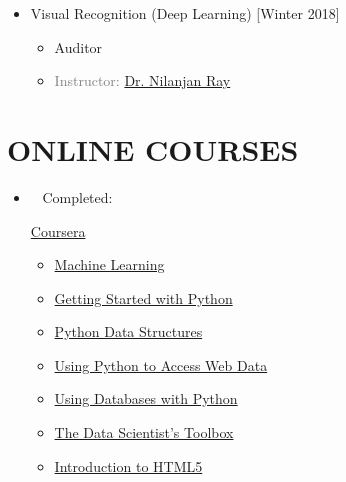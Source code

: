 \begin{multicols}{2}
\begin{itemize}
	\item {} Visual Recognition  (Deep Learning) \hfill[Winter 2018]
	\begin{itemize}
		\item Auditor 
		\item \textcolor{gray}{Instructor: \href{https://webdocs.cs.ualberta.ca/~nray1/}{Dr. Nilanjan Ray}}
	\end{itemize}
	
\end{itemize}
\end{multicols}


\section{ONLINE COURSES}
\begin{itemize}
	
	\item[] \textcolor{darkgreen}{\faCheckSquareO} ~ Completed: 
	
	\begin{multicols}{2}
	\href{http://www.coursera.org}{Coursera}
	\begin{itemize}
		\item {}  \href{https://www.coursera.org/learn/machine-learning}{Machine Learning}
		
		\item {} \href{https://www.coursera.org/learn/python}{Getting Started with Python} 
		
		\item  {} \href{https://www.coursera.org/learn/python-data}{Python Data Structures}  
		
		\item {}  \href{https://www.coursera.org/learn/python-network-data}{Using Python to Access Web Data} 
		
		\item  {} \href{https://www.coursera.org/learn/python-databases}{Using Databases with Python}  
		
		\item  {}  \href{https://www.coursera.org/learn/data-scientists-tools}{The Data Scientist's Toolbox}
			 
		\item  {} \href{https://www.coursera.org/learn/html}{Introduction to HTML5} 
		

\end{itemize}
\end{multicols}
\end{itemize}
